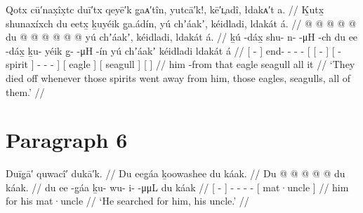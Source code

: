 
\ex\label{ex:91-46-spirits-die-off}%
%
\begingl
	\glpreamble	Qotx cū′nax̣îx̣tc duī′tx qeyē′k g̣aᴀ′tîn, yutcā′k!, kē′ʟ̣adî, łdakᴀ′t a. //
	\glpreamble	Ḵutx̱ shunaxíxch du eetx̱ ḵuyéik g̱a.ádín, yú chʼáakʼ, kéidladi, ldakát á. //
	\gla	{}  @ {} {}  @ {} @ {} @ {} @ {}
		{} {} du  @ {} {}
			{}  @ {} {}
			 @ {} @ {} @ {} @ {} {}
		{} yú chʼáakʼ, {}
		{} kéidladi, {}
		{} ldakát á. {} //
	\glb	{} ḵú -dáx̱ {} shu- n-  -μH -ch
		{} {} du ee -dáx̱ {}
			{} ḵu- yéik {}
			{} g̱-  -μH -ín {}
		{} yú chʼáakʼ {}
		{} kéidladi {}
		{} ldakát á {} //
	\glc	{}[  - {}] end- -  - -
		{}[ {}[   - {}]
			{}[ - spirit {}]
			\· -  - - {}]
		{}[  eagle {}]
		{}[ seagull {}]
		{}[   {}] //
	\gld	{}  {} {}  {} {} {} {}
		{} {} him {} -from {}
			{}  {} {}
			 {} {} {} {} {}
		{} that eagle {}
		{} seagull {}
		{} all it {} //
	\glft	‘They died off whenever those spirits went away from him, those eagles, seagulls, all of them.’
		//
\endgl
\xe

\section{Paragraph 6}\label{sec:91-para-6}

\ex\label{ex:91-47-searched-for-him-uncle}%
%
\begingl
	\glpreamble	Duīg̣ā′ quwacî′ dukā′k. //
	\glpreamble	Du eeg̱áa ḵoowashee du káak. //
	\gla	{} Du  @ {} {}
		 @ {} @ {} @ {} @ {}
		{} du káak. {} //
	\glb	{} du ee -g̱áa {}
		ḵu- wu- i-  -μμL
		{} du káak {} //
	\glc	{}[   - {}]
		- - -  -
		{}[  mat·uncle {}] //
	\gld	{} him {} for {}
		 {} {} {} {}
		{} his mat·uncle {} //
	\glft	‘He searched for him, his uncle.’
		//
\endgl
\xe

